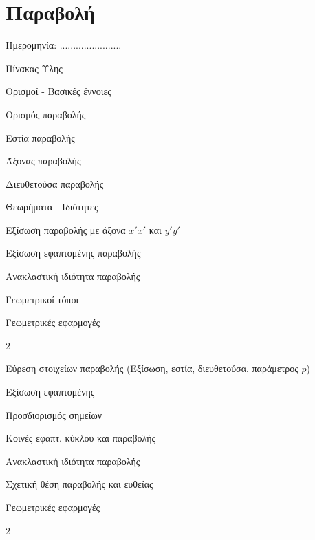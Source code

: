 \documentclass[twoside,nofonts,internet,math,spyros]{frontisthrio}
\newcommand{\myitem}{\stepcounter{enumi}\item[\raisebox{0.5mm}{\faEdit}\ \Large$\square$]}
\newcommand{\myplusitem}{\stepcounter{enumi}\item[\raisebox{0.5mm}{\faExclamationTriangle}\ \Large$\square$]}
\begin{document}
\section{Παραβολή}
\begin{flushright}
\faCalendar* Ημερομηνία: .......................
\end{flushright}
\begin{mybox}[mysubtitle]{Πίνακας Ύλης}
\begin{tcbraster}[raster columns=2,raster equal height]
\begin{myleftbox}{Ορισμοί - Βασικές έννοιες\ \ \faBook}
\begin{arithmisi}[itemsep=0mm]
\item Ορισμός παραβολής
\item Εστία παραβολής
\item Άξονας παραβολής
\item Διευθετούσα παραβολής
\end{arithmisi}
\end{myleftbox}
\begin{myrightbox}{Θεωρήματα - Ιδιότητες\ \ \faTools}
\begin{arithmisi}[itemsep=0mm]
\item Εξίσωση παραβολής με άξονα $x'x'$ και $y'y'$
\item Εξίσωση εφαπτομένης παραβολής
\item Ανακλαστική ιδιότητα παραβολής
\item Γεωμετρικοί τόποι
\item Γεωμετρικές εφαρμογές
\end{arithmisi}
\end{myrightbox}
\end{tcbraster}
\begin{multicols}{2}
\begin{todolist}[itemsep=0mm]
\myitem Εύρεση στοιχείων παραβολής (Εξίσωση, εστία, διευθετούσα, παράμετρος $p$)
\myitem Εξίσωση εφαπτομένης
\item Προσδιορισμός σημείων
\item Κοινές εφαπτ. κύκλου και παραβολής
\item Ανακλαστική ιδιότητα παραβολής
\item Σχετική θέση παραβολής και ευθείας
\myplusitem Γεωμετρικές εφαρμογές
\end{todolist}
\end{multicols}
\begin{multicols*}{2}

\end{multicols*}
\end{mybox}
\end{document}
